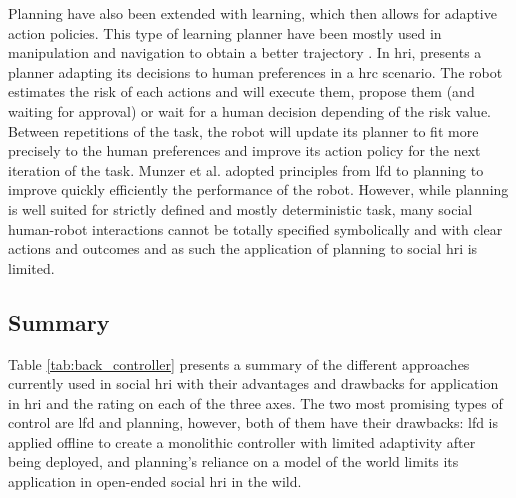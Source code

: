     
    Planning have also been extended with learning, which then allows for adaptive action policies. This type of learning planner have been mostly used in manipulation and navigation to obtain a better trajectory \citep{jain2013learning,beetz2004rpllearn}. In \gls{hri}, \cite{munzer2017efficient} presents a planner adapting its decisions to human preferences in a \gls{hrc} scenario. The robot estimates the risk of each actions and will execute them, propose them (and waiting for approval) or wait for a human decision depending of the risk value. Between repetitions of the task, the robot will update its planner to fit more precisely to the human preferences and improve its action policy for the next iteration of the task. Munzer et al. adopted principles from \gls{lfd} to planning to improve quickly efficiently the performance of the robot. However, while planning is well suited for strictly defined and mostly deterministic task, many social human-robot interactions cannot be totally specified symbolically and with clear actions and outcomes and as such the application of planning to social \gls{hri} is limited.
	
	
	
\subsection{Summary}

	Table \ref{tab:back_controller} presents a summary of the different approaches currently used in social \gls{hri} with their advantages and drawbacks for application in \gls{hri} and the rating on each of the three axes. The two most promising types of control are \gls{lfd} and planning, however, both of them have their drawbacks: \gls{lfd} is applied offline to create a monolithic controller with limited adaptivity after being deployed, and planning's reliance on a model of the world limits its application in open-ended social \gls{hri} in the wild.
	

